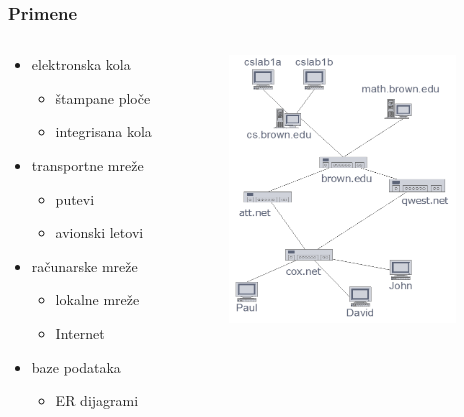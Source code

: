 \documentclass[compress]{beamer}
\begin{document}
\begin{frame}[fragile]
  \frametitle{Primene}
  \begin{columns}
    \begin{column}[t]{6cm}
      \begin{itemize}
        \item elektronska kola
        \begin{itemize}
          \item štampane ploče
          \item integrisana kola
        \end{itemize}
        \item transportne mreže
        \begin{itemize}
          \item putevi
          \item avionski letovi
        \end{itemize}
        \item računarske mreže
        \begin{itemize}
          \item lokalne mreže
          \item Internet
        \end{itemize}
        \item baze podataka
        \begin{itemize}
          \item ER dijagrami
        \end{itemize}
      \end{itemize}
    \end{column}
    \begin{column}[t]{6cm}
      \begin{center}
        \includegraphics[width=6cm]{asp-14-pic03.png}
      \end{center}
    \end{column}
  \end{columns}
\end{frame}
\end{document}

